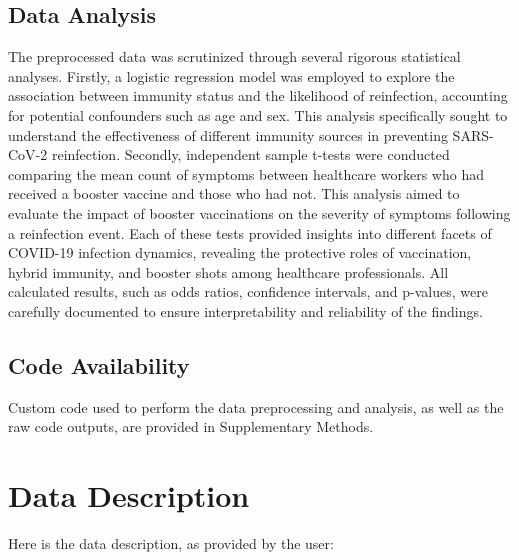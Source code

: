 \documentclass[11pt]{article}
\begin{document}
\subsection*{Data Analysis}
The preprocessed data was scrutinized through several rigorous statistical analyses. Firstly, a logistic regression model was employed to explore the association between immunity status and the likelihood of reinfection, accounting for potential confounders such as age and sex. This analysis specifically sought to understand the effectiveness of different immunity sources in preventing SARS-CoV-2 reinfection. Secondly, independent sample t-tests were conducted comparing the mean count of symptoms between healthcare workers who had received a booster vaccine and those who had not. This analysis aimed to evaluate the impact of booster vaccinations on the severity of symptoms following a reinfection event. Each of these tests provided insights into different facets of COVID-19 infection dynamics, revealing the protective roles of vaccination, hybrid immunity, and booster shots among healthcare professionals. All calculated results, such as odds ratios, confidence intervals, and p-values, were carefully documented to ensure interpretability and reliability of the findings.\subsection*{Code Availability}

Custom code used to perform the data preprocessing and analysis, as well as the raw code outputs, are provided in Supplementary Methods.






\clearpage
\appendix

\section{Data Description} \label{sec:data_description} Here is the data description, as provided by the user:
\end{document}
